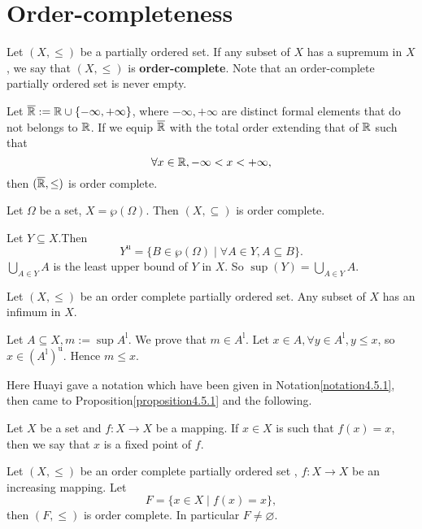 \section{Order-completeness}
\begin{definitionenv}\label{4.8.1}
    Let $(X, \le)$ be a partially ordered set. If any subset of $X$ has a supremum in $X$,  we say that  $(X,  \le)$ is \textbf{order-complete}. Note that an order-complete
partially ordered set is never empty.
\end{definitionenv}
\begin{axiomenv}
    Let $\overline{\mathbb{R}}:=\mathbb{R}\cup\{-\infty, +\infty\}$,  where $-\infty, +\infty$ are distinct formal elements that do not belongs to $\mathbb{R}$. If we equip $\overline{\mathbb{R}}$ with the total order extending that of $\mathbb{R}$ such that 
    $$\forall x\in \mathbb{R}, -\infty<x<+\infty, $$ 
    then $(\overline{\mathbb{R}}, \le)$ is order complete.
\end{axiomenv}
\begin{exampleenv}
    Let $\Omega$ be a set, $X=\wp(\Omega)$. Then $(X, \subseteq)$ is  order complete.
\end{exampleenv}
    \begin{proofenv}
        Let $Y\subseteq X$.Then 
        $$Y^{\mathrm{u}}=\{B\in\wp(\Omega)\mid \forall A\in Y, A\subseteq B\}.$$
        $\displaystyle \bigcup_{A\in Y}A$ is the least upper bound of $Y$ in $X$. So $\sup (Y)=\bigcup_{A\in Y}A$.
    \end{proofenv}
\begin{propositionenv}
    Let $(X, \le)$ be an order complete partially ordered set. Any subset of $X$ has an infimum in $X$.
\end{propositionenv}
\begin{proofenv}
    Let $A\subseteq X, m:=\sup A^\mathrm{l}$. We prove that $m\in A^\mathrm{l}$.
    \newline
    Let $x\in A, \forall y \in A^\mathrm{l}, y\le x $,  so $x\in (A^\mathrm{l})^\mathrm{u}$. Hence $m\le x$.
\end{proofenv}
Here Huayi gave a notation which have been given in Notation\ref{notation4.5.1}, then came to Proposition\ref{proposition4.5.1} and the following.
\begin{definitionenv}
    Let $X$ be a set and $f:X\rightarrow X$ be a mapping. If $x\in X $ is such that $f(x)=x$,  then we say that $x$ is a fixed point of $f$. 
\end{definitionenv}
\begin{theoremenv}
    \quad
    \newline
    Let $(X, \le)$ be an order complete partially ordered set , $f:X\rightarrow X$ be an increasing mapping. Let 
    $$F=\{x\in X\mid f(x)=x\}, $$
    then $(F, \le)$ is order complete. In particular $F\not=\varnothing$.
    
\end{theoremenv}
